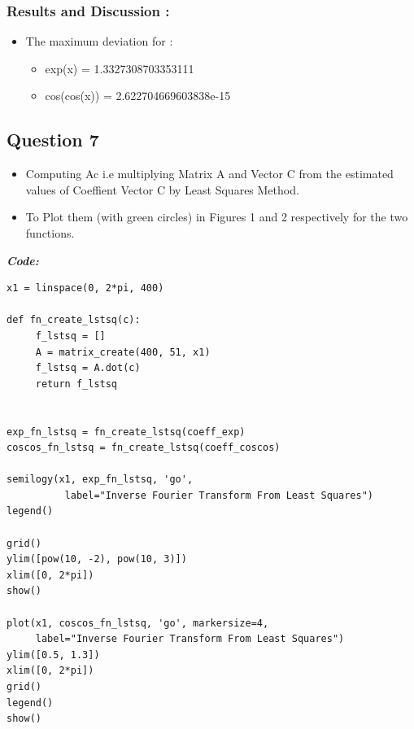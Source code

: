 \documentclass[11pt, a4paper]{article}
\begin{document}
\subsubsection{Results and Discussion :}\label{results-and-discussion}
\begin{itemize}
  \item 
  The maximum deviation for :
    \begin{itemize}
      \item exp(x) = 1.3327308703353111
      \item cos(cos(x)) = 2.622704669603838e-15
    \end{itemize}
  \end{itemize}
\break
\subsection{Question 7}\label{question-7}

\begin{itemize}
\item
  Computing Ac i.e multiplying Matrix A and Vector C from the estimated
  values of Coeffient Vector C by Least Squares Method.
\item
  To Plot them (with green circles) in Figures 1 and 2 respectively for
  the two functions.
  
\end{itemize}

\textit{\textbf{Code:}}
\begin{lstlisting}
x1 = linspace(0, 2*pi, 400)

def fn_create_lstsq(c):
     f_lstsq = []
     A = matrix_create(400, 51, x1)
     f_lstsq = A.dot(c)
     return f_lstsq


exp_fn_lstsq = fn_create_lstsq(coeff_exp)
coscos_fn_lstsq = fn_create_lstsq(coeff_coscos)

semilogy(x1, exp_fn_lstsq, 'go',
          label="Inverse Fourier Transform From Least Squares")
legend()

grid()
ylim([pow(10, -2), pow(10, 3)])
xlim([0, 2*pi])
show()

plot(x1, coscos_fn_lstsq, 'go', markersize=4,
     label="Inverse Fourier Transform From Least Squares")
ylim([0.5, 1.3])
xlim([0, 2*pi])
grid()
legend()
show()
     
\end{lstlisting}
\break
\end{document}
